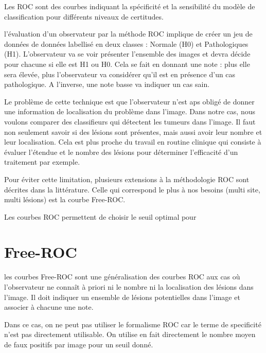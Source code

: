 Les ROC sont des courbes indiquant la spécificité et la sensibilité du modèle de classification pour différents niveaux de certitudes.


l'évaluation d'un observateur par la méthode ROC implique de créer un jeu de données de données labellisé en deux classes : Normale (H0) et Pathologiques (H1). L'observateur va se voir présenter l'ensemble des images et devra décide pour chacune si elle est H1 ou H0. Cela se fait en donnant une note : plus elle sera élevée, plus l'observateur va considérer qu'il est en présence d'un cas pathologique. A l'inverse, une note basse va indiquer un cas sain.

Le problème de cette technique est que l'observateur n'est aps obligé de donner une information de localisation du problème dans l'image. Dans notre cas, nous voulons comparer des classifieurs qui détectent les tumeurs dans l'image. Il faut non seulement savoir si des lésions sont présentes, mais aussi avoir leur nombre et leur localisation. Cela est plus proche du travail en routine clinique qui consiste à évaluer l'étendue et le nombre des lésions pour déterminer l'efficacité d'un traitement par exemple. 

Pour éviter cette limitation, plusieurs extensions à la méthodologie ROC sont décrites dans la littérature. Celle qui correspond le plus à nos besoins (multi site, multi lésions) est la courbe Free-ROC.

Les courbes ROC permettent de choisir le seuil optimal pour 

	\section{Free-ROC}	

les courbes Free-ROC sont une généralisation des courbes ROC aux cas où l'observateur ne connaît à priori ni le nombre ni la localisation des lésions dans l'image. Il doit indiquer un ensemble de lésions potentielles dans l'image et associer à chacune une note.

Dans ce cas, on ne peut pas utiliser le formalisme ROC car le terme de specificité n'est pas directement utilisable. On utilise en fait directement le nombre moyen de faux positifs par image pour un seuil donné.


